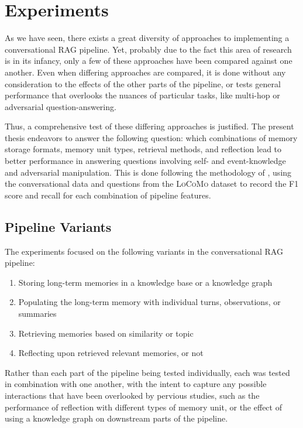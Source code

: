 \section{Experiments}

As we have seen, there exists a great diversity of approaches to implementing a conversational RAG pipeline. Yet, probably due to the fact this area of research is in its infancy, only a few of these approaches have been compared against one another. Even when differing approaches are compared, it is done without any consideration to the effects of the other parts of the pipeline, or tests general performance that overlooks the nuances of particular tasks, like multi-hop or adversarial question-answering.

Thus, a comprehensive test of these differing approaches is justified. The present thesis endeavors to answer the following question: which combinations of memory storage formats, memory unit types, retrieval methods, and reflection lead to better performance in answering questions involving self- and event-knowledge and adversarial manipulation. This is done following the methodology of \cite{Maharana2024}, using the conversational data and questions from the \textsc{LoCoMo} dataset to record the F1 score and recall for each combination of pipeline features. 
	
	

\subsection{Pipeline Variants}
	
The experiments focused on the following variants in the conversational RAG pipeline: 
	
\begin{enumerate}
  \item Storing long-term memories in a knowledge base or a knowledge graph
  
  \item Populating the long-term memory with individual turns, observations, or summaries
  
  \item Retrieving memories based on similarity or topic
  
  \item Reflecting upon retrieved relevant memories, or not 
\end{enumerate}
	
\noindent Rather than each part of the pipeline being tested individually, each was tested in combination with one another, with the intent to capture any possible interactions that have been overlooked by pervious studies, such as the performance of reflection with different types of memory unit, or the effect of using a knowledge graph on downstream parts of the pipeline.

